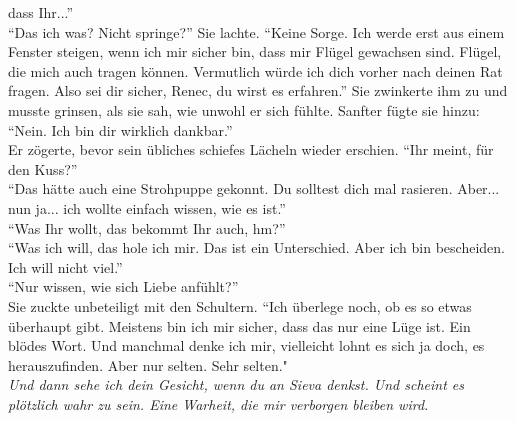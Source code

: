 dass Ihr...'' \\
``Das ich was? Nicht springe?'' Sie lachte. ``Keine Sorge. Ich werde erst aus einem Fenster 
steigen, wenn ich mir sicher bin, dass mir Flügel gewachsen sind. Flügel, die mich auch tragen 
können. Vermutlich würde ich dich vorher nach deinen Rat fragen. Also sei dir sicher, Renec, du 
wirst es erfahren.'' Sie zwinkerte ihm zu und musste grinsen, als sie sah, wie unwohl er sich 
fühlte. Sanfter fügte sie hinzu: ``Nein. Ich bin dir wirklich dankbar.''\\
Er zögerte, bevor sein übliches schiefes Lächeln wieder erschien. ``Ihr meint, für den Kuss?''\\
``Das hätte auch eine Strohpuppe gekonnt. Du solltest dich mal rasieren. Aber... nun ja... ich 
wollte einfach wissen, wie es ist.''\\
``Was Ihr wollt, das bekommt Ihr auch, hm?''\\
``Was ich will, das hole ich mir. Das ist ein Unterschied. Aber ich bin bescheiden. Ich will nicht 
viel.''\\
``Nur wissen, wie sich Liebe anfühlt?''\\
Sie zuckte unbeteiligt mit den Schultern. ``Ich überlege noch, ob es so etwas überhaupt gibt. 
Meistens bin ich mir sicher, dass das nur eine Lüge ist. Ein blödes Wort. Und manchmal denke ich 
mir, vielleicht lohnt es sich ja doch, es herauszufinden. Aber nur selten. Sehr selten."\\
\textit{Und dann sehe ich dein Gesicht, wenn du an Sieva denkst. Und scheint es plötzlich wahr 
zu sein. Eine Warheit, die mir verborgen bleiben wird.}
